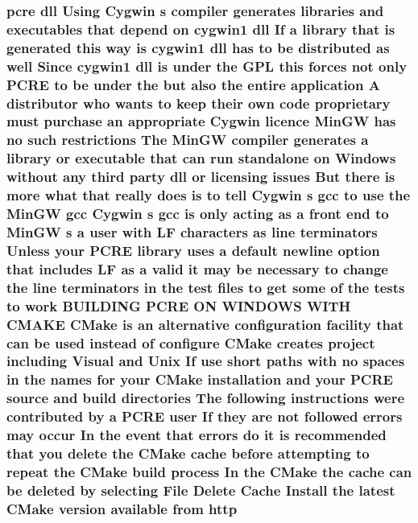 \subsubsection[{\texorpdfstring{http}{http}}]{ {\bf pcre} dll Using Cygwin {\bf s} {\bf compiler} generates {\bf libraries} and executables that depend {\bf on} cygwin1 dll If {\bf a} {\bf library} that {\bf is} {\bf generated} {\bf this} {\bf way} {\bf is} cygwin1 dll has {\bf to} {\bf be} {\bf distributed} {\bf as} well Since cygwin1 dll {\bf is} under the {\bf G\+PL} {\bf this} forces {\bf not} only {\bf P\+C\+RE} {\bf to} {\bf be} under the but also the entire application {\bf A} distributor who wants {\bf to} keep their own {\bf code} proprietary must purchase an appropriate Cygwin {\bf licence} {\bf Min\+GW} has no such restrictions The {\bf Min\+GW} {\bf compiler} generates {\bf a} {\bf library} {\bf or} executable that {\bf can} {\bf run} standalone {\bf on} {\bf Windows} without {\bf any} third party dll {\bf or} licensing issues But there {\bf is} more {\bf what} that really does {\bf is} {\bf to} tell Cygwin {\bf s} {\bf gcc} {\bf to} use the {\bf Min\+GW} {\bf gcc} Cygwin {\bf s} {\bf gcc} {\bf is} only acting {\bf as} {\bf a} front {\bf end} {\bf to} {\bf Min\+GW} {\bf s} {\bf a} user {\bf with} {\bf LF} {\bf characters} {\bf as} {\bf line} terminators Unless your {\bf P\+C\+RE} {\bf library} uses {\bf a} {\bf default} {\bf newline} {\bf option} that includes {\bf LF} {\bf as} {\bf a} valid {\bf it} may {\bf be} necessary {\bf to} change the {\bf line} terminators {\bf in} the test {\bf files} {\bf to} get some {\bf of} the {\bf tests} {\bf to} work B\+U\+I\+L\+D\+I\+NG {\bf P\+C\+RE} ON W\+I\+N\+D\+O\+WS W\+I\+TH C\+M\+A\+KE C\+Make {\bf is} an alternative configuration {\bf facility} that {\bf can} {\bf be} {\bf used} instead {\bf of} {\bf configure} C\+Make creates {\bf project} including Visual and Unix If use short paths {\bf with} no spaces {\bf in} the {\bf names} for your C\+Make installation and your {\bf P\+C\+RE} {\bf source} and build {\bf directories} The following {\bf instructions} were contributed by {\bf a} {\bf P\+C\+RE} user If they {\bf are} {\bf not} followed {\bf errors} may {\bf occur} In the event that {\bf errors} {\bf do} {\bf it} {\bf is} recommended that you delete the C\+Make {\bf cache} before attempting {\bf to} repeat the C\+Make build {\bf process} In the C\+Make the {\bf cache} {\bf can} {\bf be} deleted by selecting File Delete Cache Install the latest C\+Make version {\bf available} {\bf from} http}\hypertarget{NON-AUTOTOOLS-BUILD_8txt_a09b6b093e95da29ef33ae68c3a1dc9aa}{}\label{NON-AUTOTOOLS-BUILD_8txt_a09b6b093e95da29ef33ae68c3a1dc9aa}
